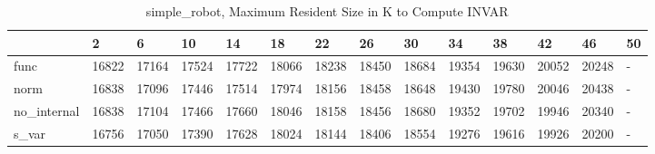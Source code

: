 \begin{table}
\caption{simple_robot, Maximum Resident Size in K to Compute INVAR}
\label{simple_robot_INVAR_size}
\begin{tabular}{llllllllllllll}
\toprule
 & 2 & 6 & 10 & 14 & 18 & 22 & 26 & 30 & 34 & 38 & 42 & 46 & 50 \\
\midrule
func & 16822 & 17164 & 17524 & 17722 & 18066 & 18238 & 18450 & 18684 & 19354 & 19630 & 20052 & 20248 & - \\
norm & 16838 & 17096 & 17446 & 17514 & 17974 & 18156 & 18458 & 18648 & 19430 & 19780 & 20046 & 20438 & - \\
no_internal & 16838 & 17104 & 17466 & 17660 & 18046 & 18158 & 18456 & 18680 & 19352 & 19702 & 19946 & 20340 & - \\
s_var & 16756 & 17050 & 17390 & 17628 & 18024 & 18144 & 18406 & 18554 & 19276 & 19616 & 19926 & 20200 & - \\
\bottomrule
\end{tabular}
\end{table}
